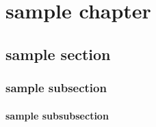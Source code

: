 \documentclass[report, backcover, french, nodocumentinfo]{upmethodology-document}
\begin{document}
	\upmdocumentsummary{}
	\upmdocumentauthors{}
	\upmdocumentinformedpeople{}

	\tableofcontents{}
	\listoffigures{}

	\chapter{sample chapter}
		\section{sample section}
			\subsection{sample subsection}
				\subsubsection{sample subsubsection}
\end{document}
